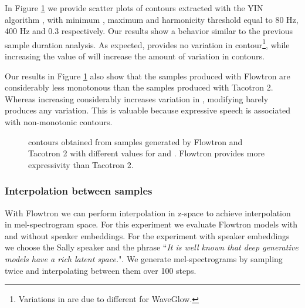 \documentclass{article}
\begin{document}
In Figure \ref{fig:pitch_contours} we provide scatter plots of  contours extracted with the YIN algorithm \cite{de2002yin}, with minimum , maximum  and harmonicity threshold equal to 80 Hz, 400 Hz and 0.3 respectively. Our results show a behavior similar to the previous sample duration analysis. As expected,  provides no variation in  contour\footnote{Variations in  are due to different  for WaveGlow.}, while increasing the value of  will increase the amount of variation in  contours. 

Our results in Figure \ref{fig:pitch_contours} also show that the samples produced with Flowtron are considerably less monotonous than the samples produced with Tacotron 2. Whereas increasing  considerably increases variation in , modifying  barely produces any variation. This is valuable because expressive speech is associated with non-monotonic  contours.

\begin{figure}[!ht]
    \centering
    
    
    
    \caption{ contours obtained from samples generated by Flowtron and Tacotron 2 with different values for  and . Flowtron provides more expressivity than Tacotron 2.}
    \label{fig:pitch_contours}
\end{figure}

\subsubsection{Interpolation between samples}
With Flowtron we can perform interpolation in z-space to achieve interpolation in mel-spectrogram space. For this experiment we evaluate Flowtron models with and without speaker embeddings. For the experiment with speaker embeddings we choose the Sally speaker and the phrase ``\textit{It is well known that deep generative models have a rich latent space.}". We generate mel-spectrograms by sampling   twice and interpolating between them over 100 steps. 
\end{document}
